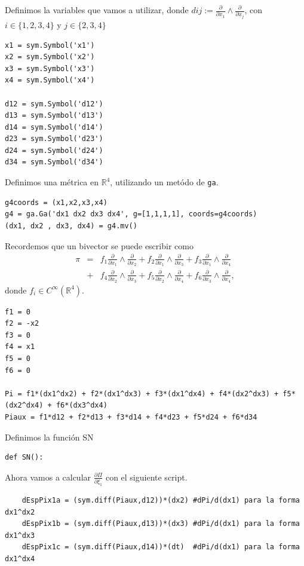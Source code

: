 \documentclass[a4paper,10pt]{book}
\begin{document}
Definimos la variables que vamos a utilizar, donde $dij:=\frac{\partial }{\partial x_{1}}\wedge\frac{\partial }{\partial x_{j}}$, con $i\in\{1,2,3,4\}$ y $j\in\{2,3,4\}$
\lstset{stepnumber=0}
\begin{lstlisting}
x1 = sym.Symbol('x1')
x2 = sym.Symbol('x2')
x3 = sym.Symbol('x3')
x4 = sym.Symbol('x4')

d12 = sym.Symbol('d12')
d13 = sym.Symbol('d13')
d14 = sym.Symbol('d14')
d23 = sym.Symbol('d23')
d24 = sym.Symbol('d24')
d34 = sym.Symbol('d34')
\end{lstlisting}
Definimos una m\'etrica en $\mathbb{R}^{4}$, utilizando un met\'odo de \texttt{ga}.
\lstset{stepnumber=0}
\begin{lstlisting}
g4coords = (x1,x2,x3,x4)
g4 = ga.Ga('dx1 dx2 dx3 dx4', g=[1,1,1,1], coords=g4coords) 
(dx1, dx2 , dx3, dx4) = g4.mv()
\end{lstlisting}
Recordemos que un bivector se puede escribir como 
\begin{eqnarray*}
\pi & = & f_{1}\frac{\partial}{\partial x_{1}}\wedge\frac{\partial}{\partial x_{2}}+f_{2}\frac{\partial}{\partial x_{1}}\wedge\frac{\partial}{\partial x_{3}}+f_{3}\frac{\partial}{\partial x_{1}}\wedge\frac{\partial}{\partial x_{4}} \\
    & + & f_{4}\frac{\partial}{\partial x_{2}}\wedge\frac{\partial}{\partial x_{3}}+f_{5}\frac{\partial}{\partial x_{2}}\wedge\frac{\partial}{\partial x_{4}}+f_{6}\frac{\partial}{\partial x_{3}}\wedge\frac{\partial}{\partial x_{4}},
\end{eqnarray*}
donde $f_{i}\in C^{\infty}(\mathbb{R}^{4})$.
\lstset{stepnumber=0}
\begin{lstlisting}
f1 = 0
f2 = -x2
f3 = 0
f4 = x1
f5 = 0
f6 = 0

Pi = f1*(dx1^dx2) + f2*(dx1^dx3) + f3*(dx1^dx4) + f4*(dx2^dx3) + f5*(dx2^dx4) + f6*(dx3^dx4) 
Piaux = f1*d12 + f2*d13 + f3*d14 + f4*d23 + f5*d24 + f6*d34
\end{lstlisting}
Definimos la funci\'on SN 
\lstset{stepnumber=0}
\begin{lstlisting}
def SN():
\end{lstlisting}
Ahora vamos a calcular $\frac{\partial\Pi}{\partial\xi_{1}}$ con el siguiente script.
\lstset{stepnumber=0}
\begin{lstlisting}
    dEspPix1a = (sym.diff(Piaux,d12))*(dx2) #dPi/d(dx1) para la forma dx1^dx2
    dEspPix1b = (sym.diff(Piaux,d13))*(dx3) #dPi/d(dx1) para la forma dx1^dx3
    dEspPix1c = (sym.diff(Piaux,d14))*(dt)  #dPi/d(dx1) para la forma dx1^dx4 
\end{lstlisting}
\end{document}
